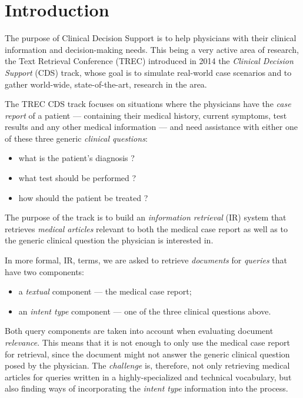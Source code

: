 \chapter{Introduction}
The purpose of Clinical Decision Support is to help physicians with their clinical information and decision-making needs.
This being a very active area of research, the Text Retrieval Conference (TREC)
introduced in 2014 the \emph{Clinical Decision Support} (CDS) track,
whose goal is to simulate real-world case scenarios and to gather world-wide, state-of-the-art, research in the area.

The TREC CDS track focuses on situations where the physicians have the \emph{case report} of a patient 
--- containing their medical history, current symptoms, test results and any other medical information --- 
and need assistance with either one of these three generic
\emph{clinical questions}: 
\begin{itemize}[noitemsep,nolistsep]
 \item what is the patient's diagnosis ?
 \item what test should be performed ?
 \item how should the patient be treated ?\end{itemize}

The purpose of the track is to build an \emph{information retrieval} (IR) system that
retrieves \emph{medical articles} relevant to both the medical
case report as well as to the generic clinical question the physician is interested in.

In more formal, IR, terms, we are asked to retrieve \emph{documents} for \emph{queries} that have two components:
\begin{itemize}[noitemsep, nolistsep]
 \item a \emph{textual} component --- the medical case report;
 \item an \emph{intent type} component --- one of the three clinical questions above.
\end{itemize}

Both query components are taken into account when evaluating document \emph{relevance}.
This means that it is not enough to only use the medical case report
for retrieval, since the document might not answer the generic clinical question posed by the physician.
The \emph{challenge} is, therefore, not only retrieving medical articles for queries written in a highly-specialized and technical
vocabulary, but also finding ways of incorporating the \emph{intent type} information into the process.

